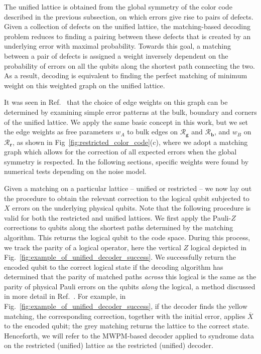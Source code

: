 \documentclass[a4paper,twocolumn,11pt,accepted=2024-12-23]{quantumarticle}
\begin{document}
The unified lattice is obtained from the global symmetry of the color code described in the previous subsection, on which errors give rise to pairs of defects. 
Given a collection of defects on the unified lattice, the matching-based decoding problem reduces to finding a pairing between these defects that is created by an underlying error with maximal probability. 
Towards this goal, a matching between a pair of defects is assigned a weight inversely dependent on the probability of errors on all the qubits along the shortest path connecting the two. 
As a result, decoding is equivalent to finding the perfect matching of minimum weight on this weighted graph on the unified lattice.

It was seen in  Ref.~\cite{sahay2022decoder} that the choice of edge weights on this graph can be determined by examining simple error patterns at the bulk, boundary and corners of the unified lattice. We apply the same basic concept in this work, but we set the edge weights as free parameters $w_A$ to bulk edges on $\mathcal{R}_\mathbf{g}$ and $\mathcal{R}_\mathbf{b}$, and $w_B$ on $\mathcal{R}_\mathbf{r}$, as shown in Fig~\ref{fig:restricted_color_code}(c), where we adopt a matching graph which allows for the correction of all expected errors when the global symmetry is respected. In the following sections, specific weights were found by numerical tests depending on the noise model.   
 
Given a matching on a particular lattice -- unified or restricted -- we now lay out the procedure to obtain the relevant correction to the logical qubit subjected to $X$ errors on the underlying physical qubits. Note that the following procedure is valid for both the restricted and unified lattices. We first apply the Pauli-$Z$ corrections to qubits along the shortest paths determined by the matching algorithm. This returns the logical qubit to the code space. During this process, we track the parity of a logical operator, here the vertical $Z$ logical depicted in Fig.~\ref{fig:example_of_unified_decoder_success}. We successfully return the encoded qubit to the correct logical state if the decoding algorithm has determined that the parity of matched paths \textit{across} this logical is the same as the parity of physical Pauli errors on the qubits \textit{along} the logical, a method discussed in more detail in Ref.~\cite{brown2022conservation, sahay2022decoder}. For example, in Fig.~\ref{fig:example_of_unified_decoder_success}, if the decoder finds the yellow matching, the corresponding correction, together with the initial error, applies $\overline{X}$ to the encoded qubit; the grey matching returns the lattice to the correct state. Henceforth, we will refer to the MWPM-based decoder applied to syndrome data on the restricted (unified) lattice as the restricted (unified) decoder.
\end{document}
